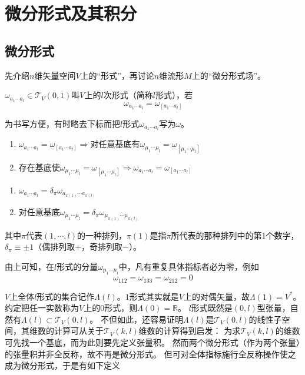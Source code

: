 \chapter{微分形式及其积分}

\section{微分形式}

先介绍$n$维矢量空间$V$上的``形式''，再讨论$n$维流形$M$上的``微分形式场''。

\begin{definition}
    $\omega_{a_1 \cdots a_l} \in \mathscr{T}_V(0, 1)$叫$V$上的$l$次形式（简称$l$形式），若
    $$\omega_{a_1 \cdots a_l} = \omega_{[a_1 \cdots a_l]}$$
\end{definition}

为书写方便，有时略去下标而把$l$形式$\omega_{a_1 \cdots a_l}$写为$\omega$。

\begin{theorem}
    \begin{enumerate}[（a）]
        \item $\omega_{a_1 \cdots a_l} = \omega_{[a_1 \cdots a_l]} \Rightarrow \text{对任意基底有} \omega_{\mu_1 \cdots \mu_l} = \omega_{[\mu_1 \cdots \mu_l]}$
        \item $\text{存在基底使} \omega_{\mu_1 \cdots \mu_l} = \omega_{[\mu_1 \cdots \mu_l]} \Rightarrow \omega_{a_1 \cdots a_l} = \omega_{[a_1 \cdots a_l]}$
    \end{enumerate}
\end{theorem}

\begin{theorem}
    \begin{enumerate}[（a）]
        \item $\omega_{a_1 \cdots a_l} = \delta_\pi\omega_{a_{\pi(1)} \cdots a_{\pi(l)}}$
        \item $\text{对任意基底} \omega_{\mu_1 \cdots \mu_l} = \delta_\pi\omega_{\mu_{\pi(1)} \cdots \mu_{\pi(l)}}$
    \end{enumerate}
    其中$\pi$代表$(1, \cdots, l)$的一种排列，$\pi(1)$是指$\pi$所代表的那种排列中的第$1$个数字，$\delta_\pi \equiv \pm 1$（偶排列取$+$，奇排列取$-$）。
\end{theorem}

由上可知，在$l$形式的分量$\omega_{\mu_1 \cdots \mu_l}$中，凡有重复具体指标者必为零，例如
$$\omega_{112} = \omega_{133} = \omega_{212} = 0$$

$V$上全体$l$形式的集合记作$\Lambda(l)$。$1$形式其实就是$V$上的对偶矢量，故$\Lambda(1) = V^*$。
约定把任一实数称为$V$上的$0$形式，则$\Lambda(0) = \mathbb{R}$。
$l$形式既然是$(0, l)$型张量，自然有$\Lambda(l) \subset \mathscr{T}_V(0, l)$。
不但如此，还容易证明$\Lambda(l)$是$\mathscr{T}_V(0, l)$的线性子空间，其维数的计算可从关于$\mathscr{T}_V(k, l)$维数的计算得到启发：
为求$\mathscr{T}_V(k, l)$的维数可先找一个基底，而为此则要先定义张量积。
然而两个微分形式（作为两个张量）的张量积并非全反称，故不再是微分形式。
但可对全体指标施行全反称操作使之成为微分形式，于是有如下定义

